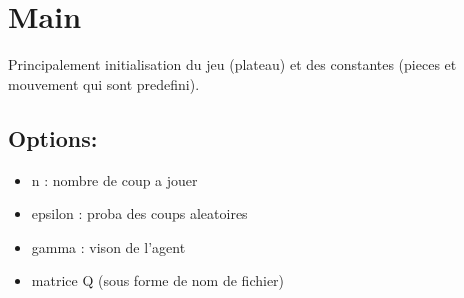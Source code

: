 \documentclass{article}
\begin{document}
\section{Main}

Principalement initialisation du jeu (plateau) et des constantes (pieces et
mouvement qui sont predefini).


\subsection{Options:}
\begin{itemize}
	\item n : nombre de coup a jouer
	\item epsilon : proba des coups aleatoires
	\item gamma : vison de l'agent
	\item matrice Q (sous forme de nom de fichier)
\end{itemize}
\end{document}
